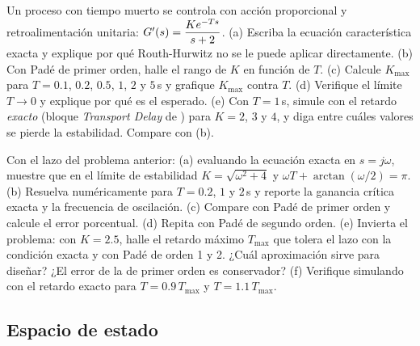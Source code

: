 \begin{problema}\label{prob:es-retardo}
Un proceso con tiempo muerto se controla con acción proporcional y retroalimentación unitaria: $G'(s)=\dfrac{Ke^{-Ts}}{s+2}$. (a) Escriba la ecuación característica exacta y explique por qué Routh-Hurwitz no se le puede aplicar directamente. (b) Con Padé de primer orden, halle el rango de $K$ en función de $T$. (c) Calcule $K_{\max}$ para $T=0.1$, $0.2$, $0.5$, $1$, $2$ y $5$\,s y grafique $K_{\max}$ contra $T$. (d) Verifique el límite $T\to0$ y explique por qué es el esperado. (e) \etiquetaM{} Con $T=1$\,s, simule con el retardo \emph{exacto} (bloque \emph{Transport Delay} de \simulink) para $K=2$, $3$ y $4$, y diga entre cuáles valores se pierde la estabilidad. Compare con (b).
\end{problema}

\begin{problema}\label{prob:es-errorpade}
\etiquetaEstrella{} Con el lazo del problema anterior: (a) evaluando la ecuación exacta en $s=j\omega$, muestre que en el límite de estabilidad $K=\sqrt{\omega^2+4}$ y $\omega T+\arctan(\omega/2)=\pi$. (b) Resuelva numéricamente para $T=0.2$, $1$ y $2$\,s y reporte la ganancia crítica exacta y la frecuencia de oscilación. (c) Compare con Padé de primer orden y calcule el error porcentual. (d) Repita con Padé de segundo orden. (e) Invierta el problema: con $K=2.5$, halle el retardo máximo $T_{\max}$ que tolera el lazo con la condición exacta y con Padé de orden 1 y 2. ¿Cuál aproximación sirve para diseñar? ¿El error de la de primer orden es conservador? (f) \etiquetaM{} Verifique simulando con el retardo exacto para $T=0.9\,T_{\max}$ y $T=1.1\,T_{\max}$.
\end{problema}

\subsection*{Espacio de estado}

